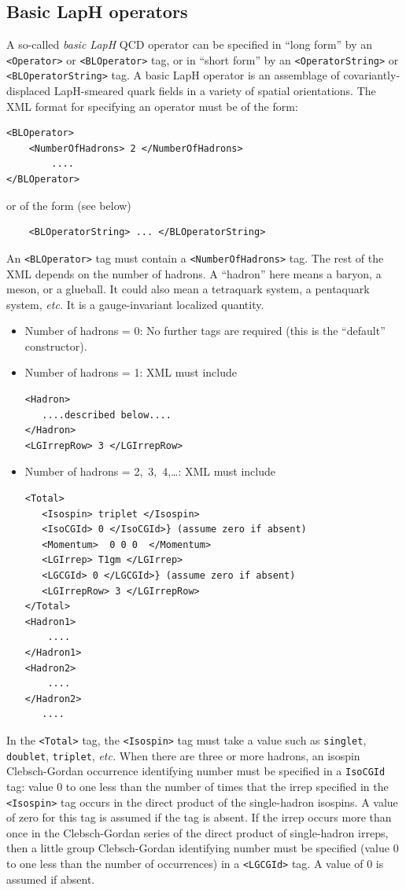 \documentclass[12pt]{article}
\newcommand{\vb}{\texttt}
\begin{document}
\subsection{Basic LapH operators}
\label{sec:qcd_op_tag}
A so-called \textit{basic LapH} QCD operator can be specified in ``long form''
by an \vb{<Operator>} or \vb{<BLOperator>} tag,
or in ``short form'' by an \vb{<OperatorString>} or \vb{<BLOperatorString>} tag.
A basic LapH operator is an assemblage of covariantly-displaced LapH-smeared
quark fields in a variety of spatial orientations.
The XML format for specifying an operator must be of the form:
\begin{verbatim}
<BLOperator>
    <NumberOfHadrons> 2 </NumberOfHadrons>
        ....
</BLOperator>
\end{verbatim}
or of the form (see below)
\begin{verbatim}
    <BLOperatorString> ... </BLOperatorString>
\end{verbatim}
An \vb{<BLOperator>} tag must contain a \vb{<NumberOfHadrons>} tag.
The rest of the XML depends on the number of hadrons.
A ``hadron'' here means a baryon, a meson, or a glueball.
It could also mean a tetraquark system, a pentaquark system,
\textit{etc.}  It is a gauge-invariant localized quantity.
\begin{itemize}
\item
  Number of hadrons = 0:
  No further tags are required
  (this is the ``default'' constructor).
\item
  Number of hadrons = 1: XML must include
\begin{verbatim}
<Hadron>
   ....described below....
</Hadron>
<LGIrrepRow> 3 </LGIrrepRow>
\end{verbatim}
\item
  Number of hadrons = 2,\ 3,\ 4,\dots:  XML must include
\begin{verbatim}
<Total>
   <Isospin> triplet </Isospin>
   <IsoCGId> 0 </IsoCGId>} (assume zero if absent)
   <Momentum>  0 0 0  </Momentum>
   <LGIrrep> T1gm </LGIrrep>
   <LGCGId> 0 </LGCGId>} (assume zero if absent)
   <LGIrrepRow> 3 </LGIrrepRow>
</Total>
<Hadron1>
    ....
</Hadron1>
<Hadron2>
    ....
</Hadron2>
   ....
\end{verbatim}
\end{itemize}
In the \vb{<Total>} tag, the \vb{<Isospin>} tag must take a value such
as \vb{singlet}, \vb{doublet}, \vb{triplet}, \textit{etc.}  When there are
three or more hadrons, an isospin Clebsch-Gordan occurrence
identifying number must be specified in a \vb{IsoCGId} tag: value 0 to
one less than the number of times that the irrep specified in the
\vb{<Isospin>}
tag occurs in
the direct product of the single-hadron isospins.  A value
of zero for this tag is assumed if the tag is absent.
If the irrep occurs more than once in the Clebsch-Gordan
series of the direct product of single-hadron irreps, then
a little group Clebsch-Gordan identifying number
must be specified (value 0 to one less than the number of
occurrences) in a \vb{<LGCGId>} tag.  A value of 0 is assumed if absent.
\end{document}
